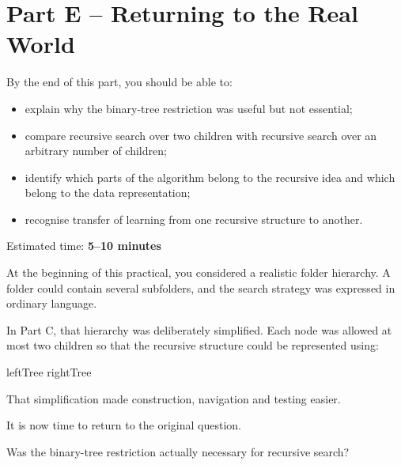 \documentclass{csc2059practical}
\begin{document}

\section{Part E -- Returning to the Real World}

\begin{learningoutcomes}
By the end of this part, you should be able to:

\begin{itemize}
    \item explain why the binary-tree restriction was useful but not essential;
    \item compare recursive search over two children with recursive search over
          an arbitrary number of children;
    \item identify which parts of the algorithm belong to the recursive idea
          and which belong to the data representation;
    \item recognise transfer of learning from one recursive structure to
          another.
\end{itemize}
\end{learningoutcomes}

\begin{infobox}
Estimated time: \textbf{5--10 minutes}
\end{infobox}

At the beginning of this practical, you considered a realistic folder
hierarchy. A folder could contain several subfolders, and the search strategy
was expressed in ordinary language.

In Part C, that hierarchy was deliberately simplified. Each node was allowed
at most two children so that the recursive structure could be represented using:

\begin{cppcode}
leftTree
rightTree
\end{cppcode}

That simplification made construction, navigation and testing easier.

It is now time to return to the original question.

\begin{engineeringquestion}
Was the binary-tree restriction actually necessary for recursive search?
\end{engineeringquestion}
\end{document}
